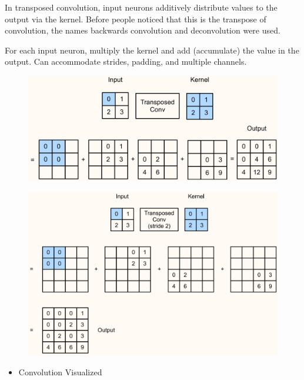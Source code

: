 \documentclass{report}
\begin{document}
\begin{definition}
    In transposed convolution, input neurons additively distribute values to the output via the kernel.
    Before people noticed that this is the transpose of convolution, the names backwards convolution and deconvolution were used.

    For each input neuron, multiply the kernel and add (accumulate) the value in the output.
    Can accommodate strides, padding, and multiple channels.

    \begin{figure}[H]
        \centering
        \includegraphics[width=1.0\textwidth]{.././assets/8.13.png}
    \end{figure}

    \begin{figure}[H]
        \centering
        \includegraphics[width=1.0\textwidth]{.././assets/8.14.png}
    \end{figure}
\end{definition}

\begin{itemize}
    \item Convolution Visualized
\end{itemize}
\end{document}
